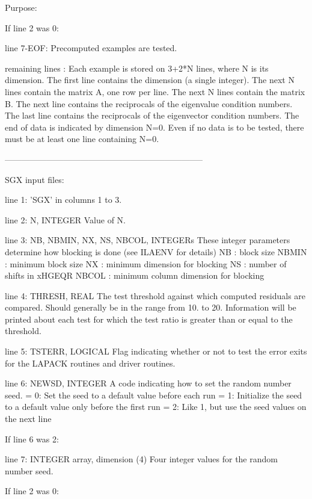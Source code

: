 \begin{DoxyParagraph}{Purpose\+: }
\begin{DoxyVerb}
 If line 2 was 0:

 line 7-EOF: Precomputed examples are tested.

 remaining lines : Each example is stored on 3+2*N lines, where N is
          its dimension. The first line contains the dimension (a
          single integer). The next N lines contain the matrix A, one
          row per line. The next N lines contain the matrix B.  The
          next line contains the reciprocals of the eigenvalue
          condition numbers.  The last line contains the reciprocals of
          the eigenvector condition numbers.  The end of data is
          indicated by dimension N=0.  Even if no data is to be tested,
          there must be at least one line containing N=0.

-----------------------------------------------------------------------

 SGX input files:

 line 1:  'SGX' in columns 1 to 3.

 line 2:  N, INTEGER
          Value of N.

 line 3:  NB, NBMIN, NX, NS, NBCOL, INTEGERs
          These integer parameters determine how blocking is done
          (see ILAENV for details)
          NB     : block size
          NBMIN  : minimum block size
          NX     : minimum dimension for blocking
          NS     : number of shifts in xHGEQR
          NBCOL  : minimum column dimension for blocking

 line 4:  THRESH, REAL
          The test threshold against which computed residuals are
          compared. Should generally be in the range from 10. to 20.
          Information will be printed about each test for which the
          test ratio is greater than or equal to the threshold.

 line 5:  TSTERR, LOGICAL
          Flag indicating whether or not to test the error exits for
          the LAPACK routines and driver routines.

 line 6:  NEWSD, INTEGER
          A code indicating how to set the random number seed.
          = 0:  Set the seed to a default value before each run
          = 1:  Initialize the seed to a default value only before the
                first run
          = 2:  Like 1, but use the seed values on the next line

 If line 6 was 2:

 line 7: INTEGER array, dimension (4)
          Four integer values for the random number seed.

 If line 2 was 0:


\end{DoxyVerb}
\end{DoxyParagraph}
